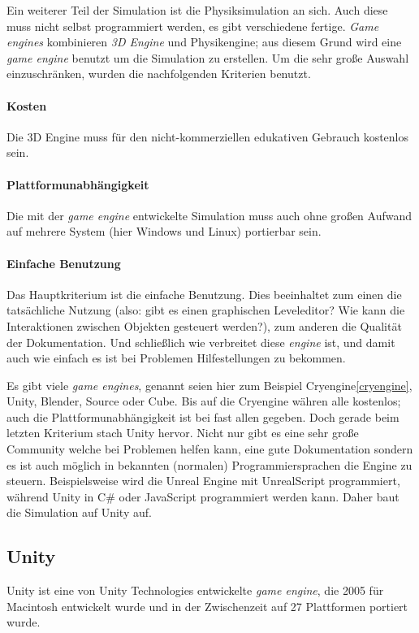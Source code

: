 Ein weiterer Teil der Simulation ist die Physiksimulation an sich. Auch diese muss nicht selbst programmiert
werden, es gibt verschiedene fertige. \textit{Game engines} kombinieren \textit{3D Engine} und Physikengine;
aus diesem Grund wird eine \textit{game engine} benutzt um die Simulation zu erstellen. Um die sehr gro{\ss}e 
Auswahl einzuschr{\"{a}}nken, wurden die nachfolgenden Kriterien benutzt.

\paragraph{Kosten} Die 3D Engine muss f{\"{u}}r den nicht-kommerziellen edukativen Gebrauch kostenlos sein.

\paragraph{Plattformunabh{\"{a}}ngigkeit} Die mit der \textit{game engine} entwickelte Simulation muss auch
ohne gro{\ss}en Aufwand auf mehrere System (hier Windows und Linux) portierbar sein.

\paragraph{Einfache Benutzung} Das Hauptkriterium ist die einfache Benutzung. Dies beeinhaltet zum einen die
tats{\"{a}}chliche Nutzung (also: gibt es einen graphischen Leveleditor? Wie kann die Interaktionen zwischen
Objekten gesteuert werden?), zum anderen die Qualit{\"{a}}t der Dokumentation. Und schlie{\ss}lich wie verbreitet diese
\textit{engine} ist, und damit auch wie einfach es ist bei Problemen Hilfestellungen zu bekommen.

Es gibt viele \textit{game engines}, genannt seien hier zum Beispiel Cryengine\ref{cryengine}, Unity, Blender, Source
oder Cube. Bis auf die Cryengine w{\"{a}}hren alle kostenlos; auch die Plattformunabh{\"{a}}ngigkeit ist bei
fast allen gegeben. Doch gerade beim letzten Kriterium stach Unity hervor. Nicht nur gibt es eine sehr gro{\ss}e
Community welche bei Problemen helfen kann, eine gute Dokumentation sondern es ist auch m{\"{o}}glich in bekannten
(normalen) Programmiersprachen die Engine zu steuern. Beispielsweise wird die Unreal Engine mit UnrealScript
programmiert, w{\"{a}}hrend Unity in C\# oder JavaScript programmiert werden kann. Daher baut die Simulation auf
Unity auf.

\subsection{Unity}\label{unity}
Unity ist eine von Unity Technologies entwickelte \textit{game engine}, die 2005 f{\"{u}}r Macintosh entwickelt wurde und in der Zwischenzeit auf 27 Plattformen portiert wurde.


